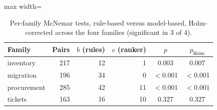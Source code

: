 \begin{table}[!ht]
\centering\scriptsize
\setlength{\tabcolsep}{4pt}
\caption{Per-family McNemar tests, rule-based versus model-based, Holm-corrected across the four families (significant in 3 of 4).}
\label{tab:appendix_tests_family}
\begin{adjustbox}{max width=\textwidth}
\begin{tabular}{@{}lrrrcc@{}}
\toprule
Family & Pairs & $b$ (rules) & $c$ (ranker) & $p$ & $p_{\text{Holm}}$ \\
\midrule
inventory & 217 & 12 & 1 & 0.003 & 0.007 \\
migration & 196 & 34 & 0 & \ensuremath{<}0.001 & \ensuremath{<}0.001 \\
procurement & 285 & 42 & 11 & \ensuremath{<}0.001 & \ensuremath{<}0.001 \\
tickets & 163 & 16 & 10 & 0.327 & 0.327 \\
\bottomrule
\end{tabular}
\end{adjustbox}
\end{table}

